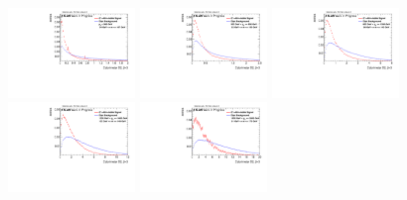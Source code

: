 \begin{figure}[H]
\bigskip
\includegraphics[width=0.3\textwidth]{sascha_input/Appendix/Distributions/higgs/distributions/beta3/h_recoJet_D2_3_bin1.pdf} \hspace{1mm}
\includegraphics[width=0.3\textwidth]{sascha_input/Appendix/Distributions/higgs/distributions/beta3/h_recoJet_D2_3_bin2.pdf} \hspace{4mm}
\includegraphics[width=0.3\textwidth]{sascha_input/Appendix/Distributions/higgs/distributions/beta3/h_recoJet_D2_3_bin3.pdf} 
\bigskip
\includegraphics[width=0.3\textwidth]{sascha_input/Appendix/Distributions/higgs/distributions/beta3/h_recoJet_D2_3_bin4.pdf} \hspace{4mm}
\includegraphics[width=0.3\textwidth]{sascha_input/Appendix/Distributions/higgs/distributions/beta3/h_recoJet_D2_3_bin5.pdf} 


\end{figure}
